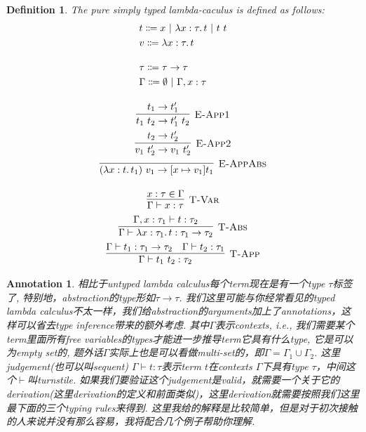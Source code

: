 \documentclass{article}
\newtheorem{definition}[theorem]{Definition}
\newtheorem{annotation}[theorem]{Annotation}
\newcommand{\lam}[2]{\ensuremath{\lambda #1\ldotp #2}} %
\newcommand{\termtype}[2]{\ensuremath{#1:#2}}
\begin{document}
\begin{definition}
\rm The pure simply typed lambda-caculus is defined as follows:
\[
	\begin{gathered}
	\begin{aligned}
	&t \Coloneqq x ~|~ \lam{\termtype{x}{\tau}}{t} ~|~ t~t \\
	&v \Coloneqq \lam{\termtype{x}{\tau}}{t} \\[1em]
	&\tau \Coloneqq \tau \to \tau \\
	&\Gamma \Coloneqq \emptyset ~|~ \Gamma, \termtype{x}{\tau}
	\end{aligned} \\[1em]
	\infer[\textsc{E-App1}]{t_1~t_2 \to t_1'~t_2}{t_1 \to t_1'} \\
	\infer[\textsc{E-App2}]{v_1~t_2' \to v_1~t_2'}{t_2 \to t_2'} \\
	\infer[\textsc{E-AppAbs}]{(\lam{\termtype{x}{t}}{t_1})~v_1 \to [x \mapsto v_1] t_1}{} \\[1em]
	\infer[\textsc{T-Var}]{\Gamma \vdash \termtype{x}{\tau}}{\termtype{x}{\tau} \in \Gamma} \\
	\infer[\textsc{T-Abs}]{\Gamma \vdash \termtype{\lam{\termtype{x}{\tau_1}}{t}}{\tau_1 \to \tau_2}}{\Gamma, \termtype{x}{\tau_1} \vdash \termtype{t}{\tau_2}} \\
	\infer[\textsc{T-App}]{\Gamma \vdash \termtype{t_1~t_2}{\tau_2}}{\Gamma \vdash \termtype{t_1}{\tau_1 \to \tau_2} & \Gamma \vdash \termtype{t_2}{\tau_1}}
	\end{gathered}
\]
\end{definition}

\begin{annotation}
\rm 相比于untyped lambda calculus每个term现在是有一个type $\tau$标签了, 特别地，abstraction的type形如$\tau \to \tau$. 我们这里可能与你经常看见的typed lambda calculus不太一样，我们给abstraction的arguments加上了annotations，这样可以省去type inference带来的额外考虑. 其中$\Gamma$表示contexts, i.e., 我们需要某个term里面所有free variables的types才能进一步推导term它具有什么type, 它是可以为empty set的, 题外话$\Gamma$实际上也是可以看做multi-set的，即$\Gamma = \Gamma_1\cup \Gamma_2$. 这里judgement(也可以叫sequent) $\Gamma \vdash t:\tau$表示term $t$在contexts $\Gamma$下具有type $\tau$，中间这个$\vdash$叫turnstile. 如果我们要验证这个judgement是valid，就需要一个关于它的derivation(这里derivation的定义和前面类似)，这里derivation就需要按照我们这里最下面的三个typing rules来得到. 这里我给的解释是比较简单，但是对于初次接触的人来说并没有那么容易，我将配合几个例子帮助你理解. 
\end{annotation}
\end{document}
